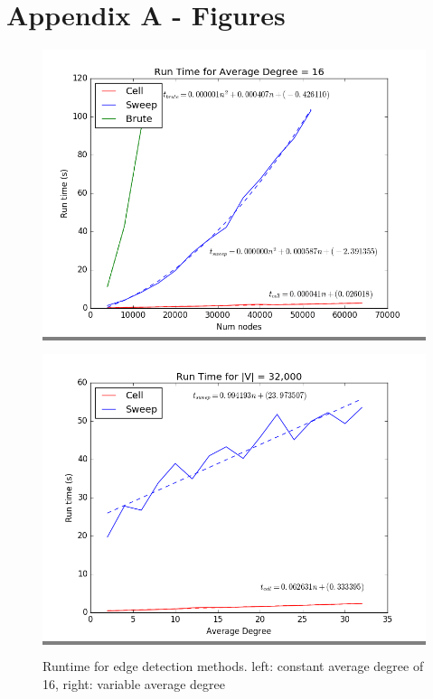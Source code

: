 \documentclass{article}
\begin{document}
\newpage

\section{Appendix A - Figures}

\begin{figure}[h]
    \begin{minipage}{0.45\textwidth}
    \colorbox{gray}{\includegraphics[width=\linewidth]{./graphs/run_time_avg_deg_16.png}}
    \end{minipage}
    \hspace{\fill}
    \begin{minipage}{0.45\textwidth}
    \colorbox{gray}{\includegraphics[width=\linewidth]{./graphs/run_time_var_avg_deg.png}}
    \end{minipage}

    \caption{Runtime for edge detection methods. left: constant average degree of 16, right: variable average degree}
    \label{avgdeg}
\end{figure}
\end{document}
